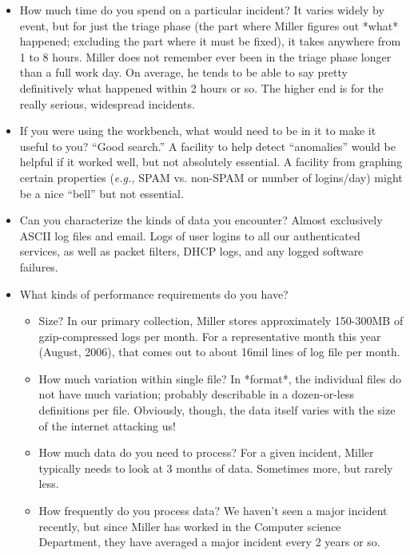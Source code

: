 \documentclass{article}
\begin{document}
\begin{itemize}
\item How much time do you spend on a particular incident?
It varies widely by event, but for just the triage phase 
(the part where Miller figures out *what* happened; 
excluding the part where it must be fixed), it takes anywhere 
from 1 to 8 hours. Miller does not remember ever been in the triage phase 
longer than a full work day. On average, he tends to be able to say 
pretty definitively what happened within 2 hours or so. The higher end 
is for the really serious, widespread incidents. 

\item If you were using the workbench, what would need to be in it to make it useful to you?  ``Good search.''  A facility to help detect ``anomalies''
would be helpful if it worked well, but not absolutely essential.
A facility from graphing certain properties ({\em e.g.,} SPAM vs. non-SPAM
or number of logins/day) might be a nice ``bell'' but not essential.

\item Can you characterize the kinds of data you encounter?  Almost
exclusively ASCII log files and email.  Logs of user logins to 
all our authenticated services, as well as packet filters, 
DHCP logs, and any logged software failures. 

\item What kinds of performance requirements do you have?
\begin{itemize}
\item Size?  In our primary collection, Miller stores 
approximately 150-300MB of gzip-compressed logs per month. 
For a representative month this year (August, 2006), 
that comes out to about 16mil lines of log file per month.

\item How much variation within single file?
In *format*, the individual files do not have much variation; 
probably describable in a dozen-or-less definitions per file. 
Obviously, though, the data itself varies with the size of the 
internet attacking us!

\item How much data do you need to process?
 For a given incident, Miller typically needs to look at 3 months of data. 
Sometimes more, but rarely less. 

\item How frequently do you process data?  
We haven't seen a major incident recently, but since Miller has worked
in the Computer science Department, they have averaged 
a major incident every 2 years or so.


\end{itemize}
\end{itemize}
\end{document}
